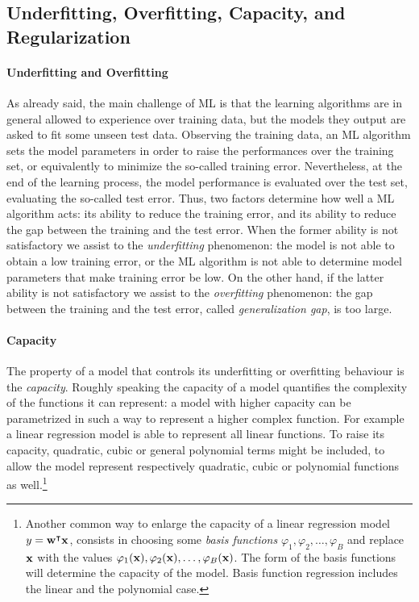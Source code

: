 \subsection{Underfitting, Overfitting, Capacity,  and Regularization}\label{sec:overfitting}
\paragraph*{Underfitting and Overfitting} As already said, the main challenge of ML is that the learning algorithms are in general allowed to experience over training data, but the models they output are asked to fit some unseen test data. Observing the training data, an ML algorithm sets the model parameters in order to raise the performances over the training set, or equivalently to minimize the so-called training error. Nevertheless, at the end of the learning process, the model performance is evaluated over the test set, evaluating the so-called test error. Thus, two factors determine how well a ML algorithm acts: its ability to reduce the training error, and its ability to reduce the gap between the training and the test error. When the former ability is not satisfactory we assist to the \emph{underfitting} phenomenon: the model is not able to obtain a low training error, or the ML algorithm is not able to determine model parameters that make training error be low. On the other hand, if the latter ability is not satisfactory we assist to the \emph{overfitting} phenomenon: the gap between the training and the test error, called \emph{generalization gap}, is too large. \\

\paragraph*{Capacity}The property of a model that controls its underfitting or overfitting behaviour is the \emph{capacity}. Roughly speaking the capacity of a model quantifies the complexity of the functions it can represent: a model with higher capacity can be parametrized in such a way to represent a higher complex function. For example a linear regression model is able to represent all linear functions. To raise its capacity, quadratic, cubic or general polynomial terms might be included, to allow the model represent respectively quadratic, cubic or polynomial functions as well.\footnote{Another common way to enlarge the capacity of a linear regression model $y = \textbf{w}^\intercal \textbf{x}$,  consists in choosing some \emph{basis functions} $\varphi_1, \varphi_2,\dots, \varphi_B$ and replace $\textbf{x}$ with the values $\varphi_1(\textbf{x}), \varphi_2(\textbf{x}),\dots, \varphi_B(\textbf{x})$. The form of the basis functions will determine the capacity of the model. Basis function regression includes the linear and the polynomial case.} \\

